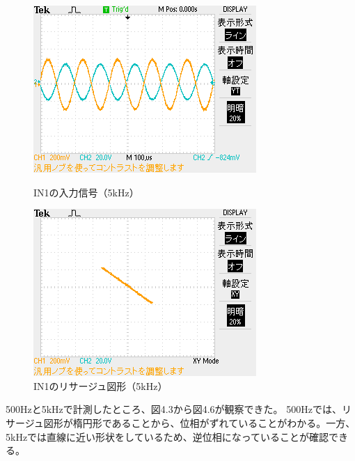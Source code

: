 \documentclass{jlreq}
\numberwithin{equation}{section}
\begin{document}
\begin{figure}[H]
  \centering
  \begin{minipage}{0.45\textwidth}
    \centering
    \includegraphics[width=\textwidth, keepaspectratio]{IN1_5kHz_YT.png}
    \caption{IN1の入力信号（5kHz）}
  \end{minipage}
  \hfill
  \begin{minipage}{0.45\textwidth}
    \centering
    \includegraphics[width=\textwidth, keepaspectratio]{IN1_5kHz_XY.png}
    \caption{IN1のリサージュ図形（5kHz）}
  \end{minipage}
\end{figure}

500Hzと5kHzで計測したところ、図4.3から図4.6が観察できた。
500Hzでは、リサージュ図形が楕円形であることから、位相がずれていることがわかる。一方、5kHzでは直線に近い形状をしているため、逆位相になっていることが確認できる。
\end{document}
